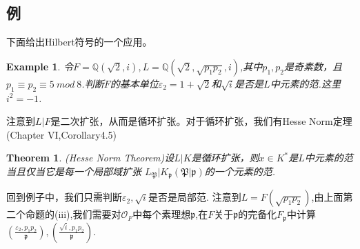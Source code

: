 \documentclass[UTF8]{article}
\newtheorem{thm}{Theorem}[section]
\newtheorem{exa}{Example}[section]
\begin{document}
\subsection{例}
下面给出Hilbert符号的一个应用。
\begin{exa}
	令$F=\mathbb{Q}(\sqrt{2},i),L=\mathbb{Q}(\sqrt{2},\sqrt{p_{1}p_{2}},i)$,其中$p_{1},p_{2}$是奇素数，且$p_{1}\equiv p_{2}\equiv 5\ mod \ 8$.判断$F$的基本单位$\varepsilon_{2}=1+\sqrt{2}$和$\sqrt{i}$是否是$L$中元素的范.这里$i^{2}=-1$.
\end{exa}
  注意到$L|F$是二次扩张，从而是循环扩张。对于循环扩张，我们有Hesse Norm定理(\cite{Ne}Chapter VI,Corollary4.5)
  \begin{thm}
  	(Hesse Norm Theorem)设$L|K$是循环扩张，则$x\in K^*$是$L$中元素的范当且仅当它是每一个局部域扩张
  	$L_{\mathfrak{P}}|K_{\mathfrak{p}}(\mathfrak{P}|\mathfrak{p})$的一个元素的范.
  \end{thm}
 回到例子中，我们只需判断$\varepsilon_{2},\sqrt{i}$是否是局部范.
 注意到$L=F(\sqrt{p_{1}p_{2}})$,由上面第二个命题的(iii),我们需要对$\mathcal{O}_{F}$中每个素理想$\mathfrak{p}$,在$F$关于$\mathfrak{p}$的完备化$F_{\mathfrak{p}}$中计算
 $\left(\frac{\varepsilon_{2},p_{1}p_{2}}{\mathfrak{p}}\right),\left(\frac{\sqrt{i},p_{1}p_{2}}{\mathfrak{p}}\right).$
 
\end{document}
